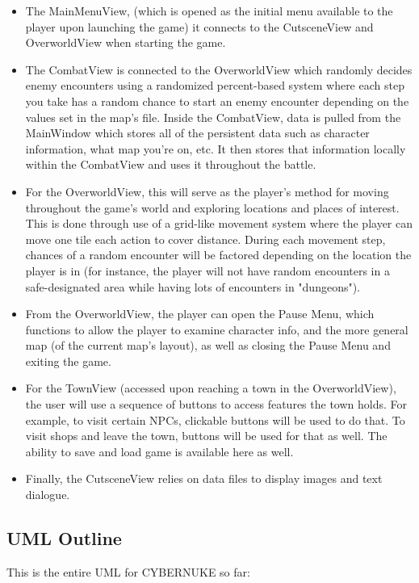 \documentclass[10pt,conference,onecolumn,compsoc]{IEEEtran}
\begin{document}
\begin{itemize}

\item The MainMenuView, (which is opened as the initial menu available to the player upon launching the game) it connects to the CutsceneView and OverworldView when starting the game.

\item The CombatView is connected to the OverworldView which randomly decides enemy encounters using a randomized percent-based system where each step you take has a random chance to start an enemy encounter depending on the values set in the map's file. Inside the CombatView, data is pulled from the MainWindow which stores all of the persistent data such as character information, what map you're on, etc. It then stores that information locally within the CombatView and uses it throughout the battle.

\item For the OverworldView, this will serve as the player's method for moving throughout the game's world and exploring locations and places of interest. This is done through use of a grid-like movement system where the player can move one tile each action to cover distance. During each movement step, chances of a random encounter will be factored depending on the location the player is in (for instance, the player will not have random encounters in a safe-designated area while having lots of encounters in "dungeons").

\item From the OverworldView, the player can open the Pause Menu, which functions to allow the player to examine character info, and the more general map (of the current map's layout), as well as closing the Pause Menu and exiting the game.

\item For the TownView (accessed upon reaching a town in the OverworldView), the user will use a sequence of buttons to access features the town holds. For example, to visit certain NPCs, clickable buttons will be used to do that. To visit shops and leave the town, buttons will be used for that as well. The ability to save and load game is available here as well.

\item Finally, the CutsceneView relies on data files to display images and text dialogue.

\end{itemize}

\subsection{UML Outline}
This is the entire UML for CYBERNUKE so far:
\end{document}
